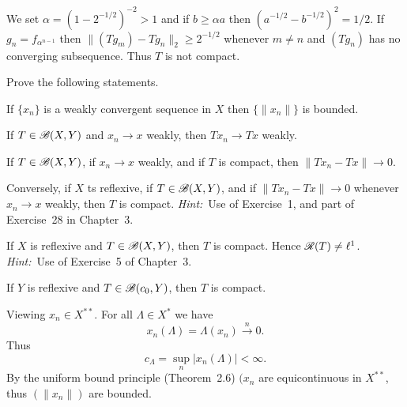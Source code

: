 \begin{enumerate}
We set \(\alpha = (1 - 2^{-1/2})^{-2} > 1\) and if \(b \geq \alpha a\)
then \(\left(a^{-1/2} - b^{-1/2}\right)^2 = 1/2\).
If \(g_n = f_{\alpha^{n-1}}\)
 then \(\|(T g_m) - T g_n\|_2 \geq 2^{-1/2}\) whenever \(m \neq n\)
and \((T g_n)\) has no converging subsequence. Thus $T$ is not compact.

\begin{excopy}
Prove the following statements.

\begin{itemize}

If \(\{x_n\}\) is a weakly convergent sequence in $X$ then \(\{\|x_n\|\}\)
 is bounded.

If \(T \in \mathscr{B}(X,Y)\) and \(x_n \to x\) weakly, then \(Tx_n \to Tx\) weakly.

If \(T \in \mathscr{B}(X,Y)\), if \(x_n \to x\) weakly, and if $T$ is compact,
 then \(\|Tx_n - Tx\| \to 0\).

Conversely, if $X$ ts reflexive, if \(T \in \mathscr{B}(X,Y)\),
 and if \(\|Tx_n - Tx\| \to 0\) whenever
\(x_n \to x\) weakly, then $T$ is compact.
\emph{Hint:}~Use  of Exercise~1, and part  of Exercise~28
 in Chapter~3.

If $X$ is reflexive and \(T \in \mathscr{B}(X,Y)\), then $T$ is compact.
 Hence \(\mathscr{R}(T) \neq \ell^1\).
\emph{Hint:}~Use  of Exercise~5 of Chapter~3.

If $Y$ is reflexive and \(T\in \mathscr{B}(c_0, Y)\), then $T$ is compact.

\end{itemize}

\end{excopy}

\begin{itemize}

Viewing \(x_n \in X^{**}\).
For all \(\Lambda \in X^*\) we have
\begin{equation*}
x_n(\Lambda) = \Lambda(x_n) \stackrel{n}{\rightarrow} 0.
\end{equation*}
Thus 
\begin{equation*}
c_\Lambda = \sup_n \left|x_n(\Lambda)\right| < \infty.
\end{equation*}
By the uniform bound principle (Theorem~2.6)
\((x_n\) are equicontinuous in \(X^{**}\), thus \((\|x_n\|)\) are bounded.





\end{itemize}
\end{enumerate}

